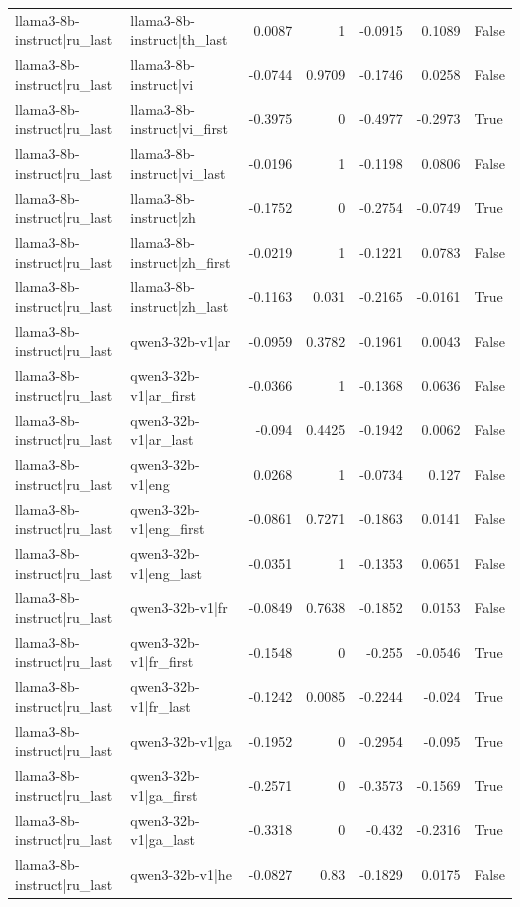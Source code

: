 \begin{table}
\begin{tabular}{l l r r r r l}
llama3-8b-instruct|ru_last & llama3-8b-instruct|th_last & 0.0087 & 1 & -0.0915 & 0.1089 & False \\
llama3-8b-instruct|ru_last & llama3-8b-instruct|vi & -0.0744 & 0.9709 & -0.1746 & 0.0258 & False \\
llama3-8b-instruct|ru_last & llama3-8b-instruct|vi_first & -0.3975 & 0 & -0.4977 & -0.2973 & True \\
llama3-8b-instruct|ru_last & llama3-8b-instruct|vi_last & -0.0196 & 1 & -0.1198 & 0.0806 & False \\
llama3-8b-instruct|ru_last & llama3-8b-instruct|zh & -0.1752 & 0 & -0.2754 & -0.0749 & True \\
llama3-8b-instruct|ru_last & llama3-8b-instruct|zh_first & -0.0219 & 1 & -0.1221 & 0.0783 & False \\
llama3-8b-instruct|ru_last & llama3-8b-instruct|zh_last & -0.1163 & 0.031 & -0.2165 & -0.0161 & True \\
llama3-8b-instruct|ru_last & qwen3-32b-v1|ar & -0.0959 & 0.3782 & -0.1961 & 0.0043 & False \\
llama3-8b-instruct|ru_last & qwen3-32b-v1|ar_first & -0.0366 & 1 & -0.1368 & 0.0636 & False \\
llama3-8b-instruct|ru_last & qwen3-32b-v1|ar_last & -0.094 & 0.4425 & -0.1942 & 0.0062 & False \\
llama3-8b-instruct|ru_last & qwen3-32b-v1|eng & 0.0268 & 1 & -0.0734 & 0.127 & False \\
llama3-8b-instruct|ru_last & qwen3-32b-v1|eng_first & -0.0861 & 0.7271 & -0.1863 & 0.0141 & False \\
llama3-8b-instruct|ru_last & qwen3-32b-v1|eng_last & -0.0351 & 1 & -0.1353 & 0.0651 & False \\
llama3-8b-instruct|ru_last & qwen3-32b-v1|fr & -0.0849 & 0.7638 & -0.1852 & 0.0153 & False \\
llama3-8b-instruct|ru_last & qwen3-32b-v1|fr_first & -0.1548 & 0 & -0.255 & -0.0546 & True \\
llama3-8b-instruct|ru_last & qwen3-32b-v1|fr_last & -0.1242 & 0.0085 & -0.2244 & -0.024 & True \\
llama3-8b-instruct|ru_last & qwen3-32b-v1|ga & -0.1952 & 0 & -0.2954 & -0.095 & True \\
llama3-8b-instruct|ru_last & qwen3-32b-v1|ga_first & -0.2571 & 0 & -0.3573 & -0.1569 & True \\
llama3-8b-instruct|ru_last & qwen3-32b-v1|ga_last & -0.3318 & 0 & -0.432 & -0.2316 & True \\
llama3-8b-instruct|ru_last & qwen3-32b-v1|he & -0.0827 & 0.83 & -0.1829 & 0.0175 & False \\

\end{tabular}
\end{table}
